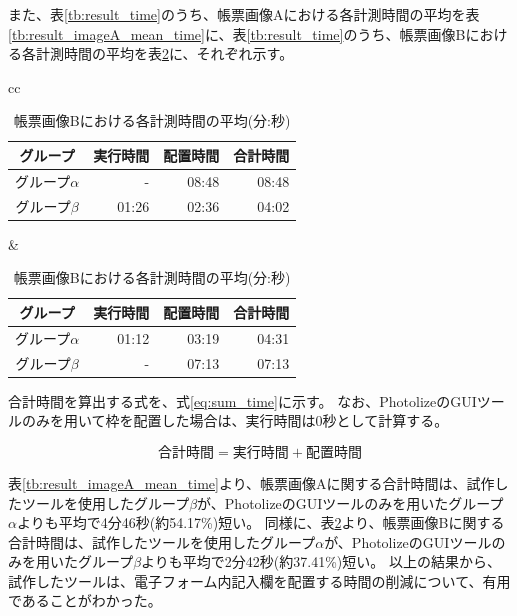 また、表\ref{tb:result_time}のうち、帳票画像Aにおける各計測時間の平均を表\ref{tb:result_imageA_mean_time}に、表\ref{tb:result_time}のうち、帳票画像Bにおける各計測時間の平均を表\ref{tb:result_imageB_mean_time}に、それぞれ示す。
\begin{table}[tp]
	\centering
    \begin{tabular}{cc}
        \begin{minipage}[c]{0.5\hsize}
            \centering
            \caption{帳票画像Aにおける各計測時間の平均(分:秒)}
            \label{tb:result_imageA_mean_time}
            \begin{tabular}{c|rrr}
                グループ & 実行時間 & 配置時間 & 合計時間 \\
                \hline \hline
                グループ$\alpha$ & - & 08:48 & 08:48 \\
                グループ$\beta$ & 01:26 & 02:36 & 04:02 \\
	        \end{tabular}
        \end{minipage} &
        \begin{minipage}[c]{0.5\hsize}
            \centering
            \caption{帳票画像Bにおける各計測時間の平均(分:秒)}
            \label{tb:result_imageB_mean_time}
            \begin{tabular}{c|rrr}
                グループ & 実行時間 & 配置時間 & 合計時間 \\
                \hline \hline
                グループ$\alpha$ & 01:12 & 03:19 & 04:31 \\
                グループ$\beta$ & - & 07:13 & 07:13 \\
            \end{tabular}
        \end{minipage}
    \end{tabular}
\end{table}
合計時間を算出する式を、式\ref{eq:sum_time}に示す。
なお、PhotolizeのGUIツールのみを用いて枠を配置した場合は、実行時間は0秒として計算する。

\begin{equation}\label{eq:sum_time}
    合計時間=実行時間+配置時間
\end{equation}

表\ref{tb:result_imageA_mean_time}より、帳票画像Aに関する合計時間は、試作したツールを使用したグループ$\beta$が、PhotolizeのGUIツールのみを用いたグループ$\alpha$よりも平均で4分46秒(約54.17\%)短い。
同様に、表\ref{tb:result_imageB_mean_time}より、帳票画像Bに関する合計時間は、試作したツールを使用したグループ$\alpha$が、PhotolizeのGUIツールのみを用いたグループ$\beta$よりも平均で2分42秒(約37.41\%)短い。
以上の結果から、試作したツールは、電子フォーム内記入欄を配置する時間の削減について、有用であることがわかった。





